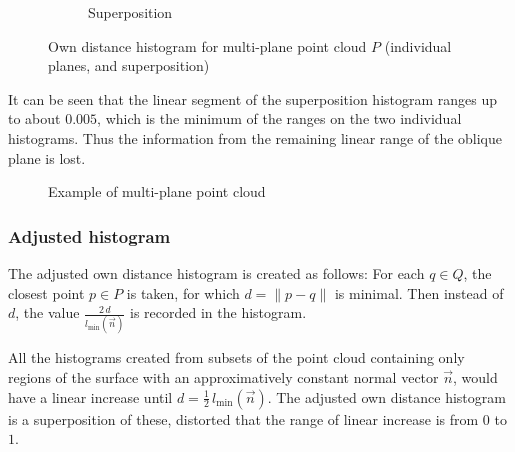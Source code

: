 \begin{figure}[H]
\begin{subfigure}{.32\textwidth}
	\caption{Superposition}
\end{subfigure}
\caption{Own distance histogram for multi-plane point cloud $P$ (individual planes, and superposition)}
\end{figure}

It can be seen that the linear segment of the superposition histogram ranges up to about $0.005$, which is the minimum of the ranges on the two individual histograms. Thus the information from the remaining linear range of the oblique plane is lost.

\begin{figure}[p]
\centering
{
	\setlength{\fboxsep}{0pt}%
	\setlength{\fboxrule}{0.5pt}%
}
\caption{Example of multi-plane point cloud}
\label{fig:disks1}
\end{figure}

\subsubsection{Adjusted histogram}
The adjusted own distance histogram is created as follows: For each $q \in Q$, the closest point $p \in P$ is taken, for which $d = \|p - q\|$ is minimal. Then instead of $d$, the value $\frac{2 \, d}{l_{\text{min}}(\vec{n})}$ is recorded in the histogram.

All the histograms created from subsets of the point cloud containing only regions of the surface with an approximatively constant normal vector $\vec{n}$, would have a linear increase until $d = \frac{1}{2} \, l_{\text{min}}(\vec{n})$. The adjusted own distance histogram is a superposition of these, distorted that the range of linear increase is from $0$ to $1$.

